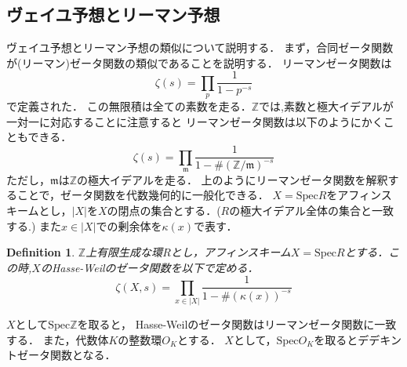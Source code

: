 \documentclass{ujarticle}
\newtheorem{dfn}[thm]{Definition}
\begin{document}
\subsection{ヴェイユ予想とリーマン予想}
\label{sub:ヴェイユ予想とリーマン予想}

ヴェイユ予想とリーマン予想の類似について説明する．
まず，合同ゼータ関数が(リーマン)ゼータ関数の類似であることを説明する．
リーマンゼータ関数は
\begin{equation*}
 \zeta(s)= \prod_{p}\frac{1}{1-p^{-s}}
\end{equation*}
で定義された．
この無限積は全ての素数を走る．$\mathbb{Z}$では,素数と極大イデアルが一対一に対応することに注意すると
リーマンゼータ関数は以下のようにかくこともできる．
\begin{equation*}
 \zeta(s) = \prod_{\mathfrak{m}}
 \frac{1}{1-{\#(\mathbb{Z}/\mathfrak{m})}^{-s}}
\end{equation*}
ただし，$\mathfrak{m}$は$\mathbb{Z}$の極大イデアルを走る．
上のようにリーマンゼータ関数を解釈することで，ゼータ関数を代数幾何的に一般化できる．
$X=\mathrm{Spec}R$をアフィンスキームとし，$|X|$を$X$の閉点の集合とする．($R$の極大イデアル全体の集合と一致する.)
また$x \in |X|$での剰余体を$\kappa(x)$で表す．
\begin{dfn}
  $\mathbb{Z}$上有限生成な環$R$とし，アフィンスキーム$X=\mathrm{Spec}R$とする．この時,$X$のHasse-Weilのゼータ関数を以下で定める．
  \begin{equation*}
   \zeta(X,s)=\prod_{x \in |X|} \frac{1}{1-\#(\kappa(x))^{-s}}
  \end{equation*}
\end{dfn}
$X$として$\mathrm{Spec}\mathbb{Z}$を取ると，
Hasse-Weilのゼータ関数はリーマンゼータ関数に一致する．
また，代数体$K$の整数環$O_K$とする．
$X$として，$\mathrm{Spec}O_K$を取るとデデキントゼータ関数となる．
\end{document}
